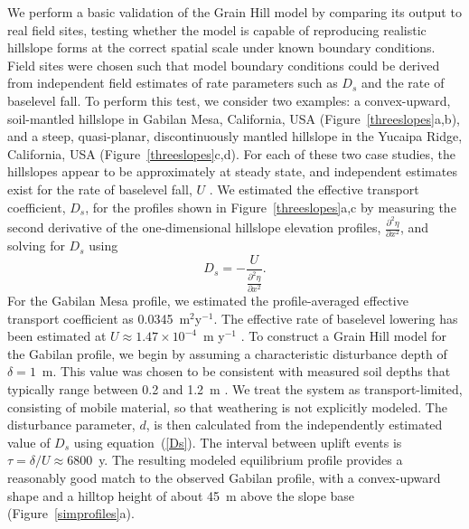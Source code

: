 \documentclass[esurf, manuscript]{copernicus}
\begin{document}
We perform a basic validation of the Grain Hill model by comparing its output to real field sites, testing whether the model is capable of reproducing realistic hillslope forms at the correct spatial scale under known boundary conditions. Field sites were chosen such that model boundary conditions could be derived from independent field estimates of rate parameters such as $D_s$ and the rate of baselevel fall. To perform this test, we consider two examples: a convex-upward, soil-mantled hillslope in Gabilan Mesa, California, USA (Figure~\ref{threeslopes}a,b), and a steep, quasi-planar, discontinuously mantled hillslope in the Yucaipa Ridge, California, USA (Figure~\ref{threeslopes}c,d). For each of these two case studies, the hillslopes appear to be approximately at steady state, and independent estimates exist for the rate of baselevel fall, $U$ \citep{binnie2007tectonic,perron2009formation,perron2012root}.  We estimated the effective transport coefficient, $D_s$,  for the profiles shown in Figure~\ref{threeslopes}a,c by measuring the second derivative of the one-dimensional hillslope elevation profiles, $\frac{\partial^2 \eta}{\partial x^2}$, and solving for  $D_s$ using
\begin{equation}
D_s = - \frac{U}{\frac{\partial^2 \eta}{\partial x^2}}.
\label{measureD}
\end{equation}
For the Gabilan Mesa profile, we  estimated the profile-averaged effective transport coefficient as 0.0345~m$^2$y$^{-1}$. The effective rate of baselevel lowering has been estimated at $U \approx 1.47\times 10^{-4}$~m y$^{-1}$ \citep{perron2012root}. To construct a Grain Hill model for the Gabilan profile, we begin by assuming a characteristic disturbance depth of $\delta=1$~m. This value was chosen to be consistent with measured soil depths that typically range between 0.2 and 1.2~m \citep{johnstone2017soil}. We treat the system as transport-limited, consisting of mobile material, so that weathering is not explicitly modeled. The disturbance parameter, $d$, is then calculated from the independently estimated value of $D_s$ using equation~(\ref{Ds}). The interval between uplift events is $\tau = \delta / U \approx 6800$~y. The resulting modeled equilibrium profile provides a reasonably good match to the observed Gabilan profile, with a convex-upward shape and a hilltop height of about 45~m above the slope base (Figure~\ref{simprofiles}a).
\end{document}
